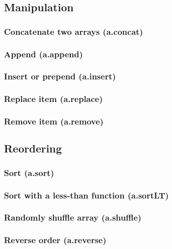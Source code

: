 \documentclass{article}
\theoremstyle{definition}
\begin{document}
\subsection{Manipulation}

\subsubsection{Concatenate two arrays (a.concat)}

\subsubsection{Append (a.append)}

\subsubsection{Insert or prepend (a.insert)}

\subsubsection{Replace item (a.replace)}

\subsubsection{Remove item (a.remove)}

\subsection{Reordering}

\subsubsection{Sort (a.sort)}

\subsubsection{Sort with a less-than function (a.sortLT)}

\subsubsection{Randomly shuffle array (a.shuffle)}

\subsubsection{Reverse order (a.reverse)}
\end{document}
